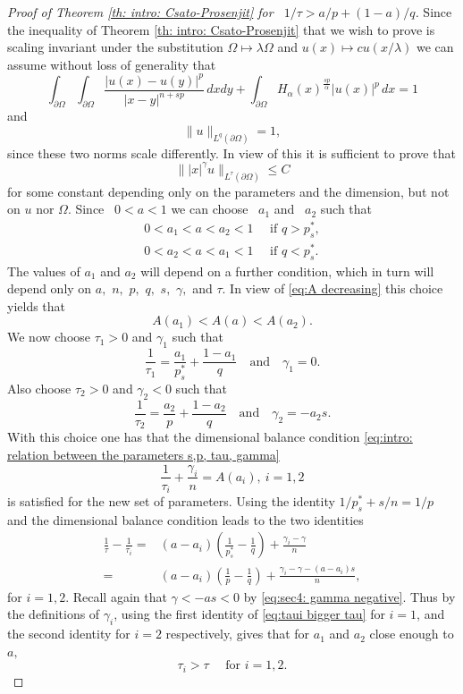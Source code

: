 \documentclass[reqno,12pt]{amsart}
\newcommand{\delomega}{\partial\Omega}
\numberwithin{equation}{section}
\theoremstyle{plain}
\theoremstyle{definition}
\renewcommand{\leq}{\leqslant}
\begin{document}
\begin{proof}[Proof of Theorem \ref{th: intro: Csato-Prosenjit} for ~$1/\tau>a/p+(1-a)/q$]
Since the inequality of Theorem \ref{th: intro: Csato-Prosenjit} that we wish to prove is scaling invariant under the substitution $\Omega\mapsto\lambda \Omega$ and $u(x)\mapsto cu(x/\lambda)$ we can assume without loss of generality that 
$$\int_{\delomega}\int_{\delomega} \frac{|u(x)-u(y)|^p}{|x-y|^{n+ s p}} \, dx dy +\int_{\delomega}H_{\alpha}(x)^{\frac{s p}{\alpha}} |u(x)|^p \, dx =1$$
and 
$$\|u\|_{L^{q}(\delomega)}=1,$$
since these two norms scale differently.  In view of this  it is sufficient to prove that 
$$ \||x|^\gamma u\|_{L^{\tau}(\delomega)}\leq C$$
for some constant depending only on the parameters and the dimension, but not on $u$ nor $\Omega$.
 Since ~$0<a<1$ we can choose ~$a_1$ and  ~$a_2$  such that
\begin{displaymath}
   \begin{split}
      0<a_1<a<a_2<1\quad \text{ if $q >p_s^*$},       
      \\
      0<a_2<a<a_1<1 \quad \text{ if $q < p_s^*$}.
\end{split}
\end{displaymath}
The values of $a_1$ and $a_2$ will depend on a further condition, which in turn will depend only on $a,$ $n,$ $p,$ $q,$ $s,$ $\gamma,$ and $\tau$.
In view of \eqref{eq:A decreasing} this choice yields that
$$
  A(a_1)< A(a)<A(a_2).
$$
We now choose $\tau_1>0$ and $\gamma_1 $ such that 
$$
  \frac{1}{\tau_1}=\frac{a_1}{p_s^*}+\frac{1-a_1}{q} \quad\textrm{and}\quad   \gamma_1 = 0.
$$
Also choose $\tau_2>0$ and $\gamma_2 < 0$ such that 
$$
  \frac{1}{\tau_2}=\frac{a_2}{p}+\frac{1-a_2}{q} \quad \textrm{and} \quad \gamma_2 = -a_2s.
$$
With this choice one has that the dimensional balance condition \eqref{eq:intro: relation between the parameters s,p, tau, gamma}
$$ \frac{1}{\tau_i} + \frac{\gamma_i}{n} = A(a_i), \ i=1,2 $$
is satisfied for the new set of parameters. Using the identity $1/p_s^*+s/n=1/p$ and the dimensional balance condition leads to the two identities 
\begin{equation}
 \label{eq:taui bigger tau}
   \begin{split}
     \frac{1}{\tau}-\frac{1}{\tau_i}= &
     (a-a_i)\left(\frac{1}{p_s^*}-\frac{1}{q}\right)+\frac{\gamma_i-\gamma}{n}
     \\
     =& (a-a_i)\left(\frac{1}{p}-\frac{1}{q}\right)+\frac{\gamma_i-\gamma-(a-a_i)s}{n},
   \end{split}
\end{equation}
for $i=1,2$. Recall again that $\gamma<-as<0$ by  \eqref{eq:sec4: gamma negative}. 
Thus by the definitions of $\gamma_i$, using the first identity of \eqref{eq:taui bigger tau} for $i=1$, and the second identity for $i=2$ respectively, gives that for $a_1$ and $a_2$ close enough to $a,$ 
\begin{equation}
  \label{eq:taui bigger tau final}
    \tau_i >\tau\quad\text{ for }i=1,2. 
\end{equation} 



\end{proof}
\end{document}
